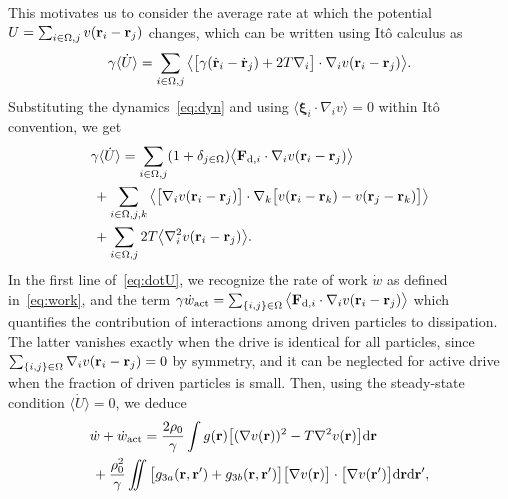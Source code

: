 \documentclass[superscriptaddress, twocolumn, prx, longbibliography, nofootinbib]{revtex4-1}
\newcommand{\dd}{\text{d}}
\begin{document}
This motivates us to consider the average rate at which the potential $U = \sum_{i\in\Omega,j} v({\bf r}_i-{\bf r}_j)$ changes, which can be written using It\^o calculus as
\begin{equation}
	\gamma\langle\dot U \rangle = \sum_{i\in\Omega,j} \big\langle\big[\gamma(\dot{\bf r}_i - \dot{\bf r}_j) + 2 T \nabla_i\big] \cdot \nabla_i v({\bf r}_i-{\bf r}_j)\big\rangle .
\end{equation}
Substituting the dynamics~\eqref{eq:dyn} and using $\langle{\boldsymbol\xi}_i\cdot\nabla_i v\rangle=0$ within It\^o convention, we get
\begin{equation}\label{eq:dotU}
	\begin{aligned}
		&\gamma\langle\dot U \rangle = \sum_{i\in\Omega,j} (1+\delta_{j\in\Omega}) \big\langle{\bf F}_{{\rm d},i} \cdot \nabla_i v({\bf r}_i-{\bf r}_j)\big\rangle
		\\
		&\,+ \sum_{i\in\Omega,j,k} \big\langle \big[\nabla_i v({\bf r}_i-{\bf r}_j)\big] \cdot \nabla_k\big[ v({\bf r}_i-{\bf r}_k) - v({\bf r}_j-{\bf r}_k) \big] \big\rangle
		\\
		&\,+ \sum_{i\in\Omega,j} 2T\big\langle\nabla_i^2 v({\bf r}_i-{\bf r}_j) \big\rangle .
    \end{aligned}
\end{equation}
In the first line of~\eqref{eq:dotU}, we recognize the rate of work $\dot w$ as defined in~\eqref{eq:work}, and the term $\gamma\dot w_{\rm act} = \sum_{\{i,j\}\in\Omega} \big\langle{\bf F}_{{\rm d},i} \cdot \nabla_i v({\bf r}_i-{\bf r}_j)\big\rangle$ which quantifies the contribution of interactions among driven particles to dissipation. The latter vanishes exactly when the drive is identical for all particles, since $\sum_{\{i,j\}\in\Omega}\nabla_iv({\bf r}_i-{\bf r}_j) = 0$ by symmetry, and it can be neglected for active drive when the fraction of driven particles is small. Then, using the steady-state condition $\langle\dot U \rangle=0$, we deduce
\begin{equation}\label{eq:balance}
	\begin{aligned}
		&\dot w + \dot w_{\rm act} = \frac{2\rho_0}{\gamma} \int g({\bf r}) \big[(\nabla v({\bf r}))^2 - T \nabla^2 v({\bf r})\big] \dd{\bf r}
		\\
		&\, + \frac{\rho_0^2}{\gamma} \iint\big[ g_{3a}({\bf r}, {\bf r}') + g_{3b}({\bf r}, {\bf r}')\big]  \big[\nabla v({\bf r})\big] \cdot \big[\nabla v({\bf r}')\big] \dd{\bf r} \dd{\bf r}' ,
	\end{aligned}
\end{equation}
\end{document}
